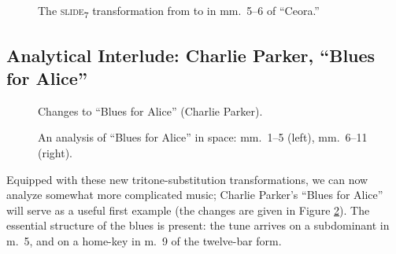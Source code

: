 \begin{figure}[htbp]
  \caption[The \protect\slideS transformation from \protect\h{Dbmaj7} to
  \protect\h{Dm7} in mm.~5--6 of ``Ceora.'']{The
    \textsc{slide}\textsubscript{7} transformation from \protect{}
    to \protect{} in mm.~5--6 of ``Ceora.''}
  \label{tft:slide7-ceora}
\end{figure}




\subsection{Analytical Interlude: Charlie Parker, “Blues for Alice”}
\label{sec:blues-for-alice}

\begin{figure}[tbp]
  \caption{Changes to ``Blues for Alice'' (Charlie Parker).}
  \label{tft:blues-alice-changes}
\end{figure}
\begin{figure}[btp]
  \caption[An analysis of ``Blues for Alice'' in \tf space]{An analysis of
    ``Blues for Alice'' in \tf space: mm.~1--5 (left), mm.~6--11 (right).}
  \label{tft:blues-alice-space}
\end{figure}

Equipped with these new tritone-substitution transformations, we can now
analyze somewhat more complicated music; Charlie Parker’s “Blues for Alice”
will serve as a useful first example (the changes are given in Figure
\ref{tft:blues-alice-changes}). The essential structure of the blues is
present: the tune arrives on a subdominant in m.~5, and on a home-key \tf in
m.~9 of the twelve-bar form.


